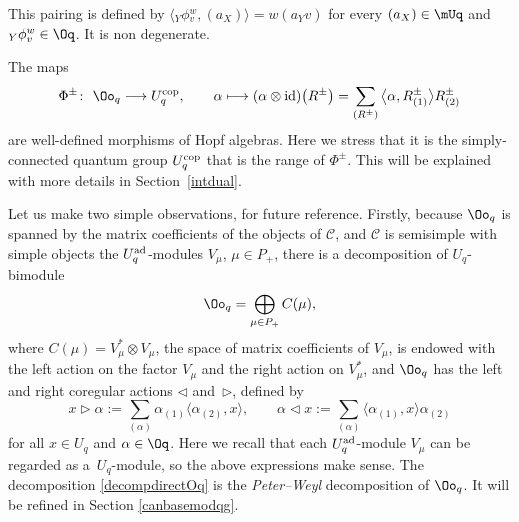 \centerline{}

This pairing is defined by $\langle {}_Y\phi{}^w_v , (a_{X})\rangle=w(a_{Y}v)$
for every $(a_{X})\in \mUq$ and ${}_Y\phi{}^w_v\in \Oq$. It is non degenerate.


The maps
\begin{gather}\label{phipm}
\Phi^\pm\colon\ \Oo_q \longrightarrow U_q^{\rm cop},\qquad \alpha\longmapsto (\alpha \otimes {\rm id})\big(R^\pm\big)= \sum_{(R^\pm)} \big\langle \alpha , R_{(1)}^\pm\big\rangle R_{(2)}^\pm
\end{gather}
are well-defined morphisms of Hopf algebras. Here we stress that it is the simply-connected quantum group $U_q^{\rm cop}$ that is the range of $\Phi^\pm$. This will be explained with more details in Section~\ref{intdual}.

Let us make two simple observations, for future reference. Firstly, because $\Oo_q$ is spanned by the matrix coefficients of the objects of $\mathcal{C}$, and $\mathcal{C}$ is semisimple with simple objects the $U_q^{\rm ad}$-modules $V_\mu$, $\mu\in P_+$, there is a decomposition of $U_q$-bimodule
\begin{equation}\label{decompdirectOq}
 \Oo_q = \bigoplus_{\mu\in P_+} C(\mu),
 \end{equation}
 where $C(\mu) = V_\mu^* \otimes V_\mu$, the space of matrix coefficients of $V_\mu$, is endowed with the left action on the factor $V_\mu$ and the right action on $V_\mu^*$, and $\Oo_q$ has the left and right coregular actions $\lhd$ and~$\rhd$, defined by
\[x\rhd \alpha := \sum_{(\alpha)}\alpha_{(1)} \langle \alpha_{(2)},x\rangle,\qquad \alpha \lhd x := \sum_{(\alpha)} \langle \alpha_{(1)},x\rangle \alpha_{(2)}\]
for all $x\in U_q$ and $\alpha\in \Oq$. Here we recall that each $U_q^{\rm ad}$-module $V_\mu$ can be regarded as a~$U_q$-module, so the above expressions make sense. The decomposition \eqref{decompdirectOq} is the {\it Peter--Weyl} decomposition of $\Oo_q$. It will be refined in Section \ref{canbasemodqg}.

